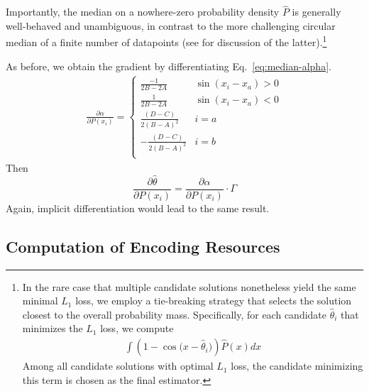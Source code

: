 Importantly, the median on a nowhere-zero probability density $\widehat{P}$ is generally well-behaved and unambiguous, in contrast to the more challenging circular median of a finite number of datapoints (see \citet{otieno2003more} for discussion of the latter).\footnote{In the rare case that multiple candidate solutions nonetheless yield the same minimal $L_1$ loss, we employ a tie-breaking strategy that selects the solution closest to the overall probability mass. Specifically, for each candidate $\widehat{\theta}_i$ that minimizes the $L_1$ loss, we compute
\begin{align*}
    \int (1-\cos\bigl(x - \widehat{\theta}_i\bigr)) \widehat{P}(x)  dx
\end{align*}
Among all candidate solutions with optimal $L_1$ loss, the candidate minimizing this term is chosen as the final estimator.}



As before, we obtain the gradient by differentiating Eq.~\ref{eq:median-alpha}. 
\begin{align*}
    \frac{\partial \alpha}{\partial P(x_i)} = \begin{cases}
        \frac{-1}{2B-2A} & \sin(x_i-x_a) > 0 \\
        \frac{1}{2B-2A} & \sin(x_i-x_a) < 0 \\
      \frac{(D-C)}{2(B-A)^2}  & i=a \\
        -\frac{(D-C)}{2(B-A)^2} & i=b \\
    \end{cases}
\end{align*}
Then
\begin{equation}
    \frac{\partial \widehat{\theta}}{\partial P(x_i)} = \frac{\partial \alpha}{\partial P(x_i)} \cdot \Gamma
\end{equation}
Again, implicit differentiation would lead to the same result. 

\subsection{Computation of Encoding Resources}\label{sec:compute-fi}

